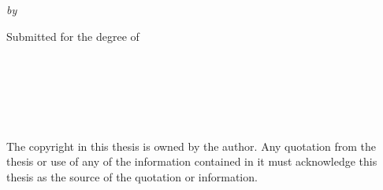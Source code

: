 \begin{center}
\vspace*{15pt}\par

\begin{spacing}{1.8}
{\Large\bfseries\MakeLowercase{\capitalisewords{\thesisTitle}}}
\end{spacing}


\vspace{50pt}\par

{\itshape\fontsize{15.5pt}{19pt}\selectfont by}\vspace{15pt}

{
\Large \authorName
}

\vspace{50pt}\par

{
\fontsize{15pt}{18pt}\selectfont Submitted for the degree of \\ \vspace{8pt} \fontsize{16pt}{19pt}\selectfont\degree
}

\vspace{140pt}\par


{\scshape\large{} \institution\\ \school\\ \university\\
}

\vspace{80pt}\par


{\Large \monthDate\ \yearDate}

\vfill

\begin{flushleft}
\doublespacing
The copyright in this thesis is owned by the author. Any quotation from the thesis or use of any of the information contained in it must acknowledge this thesis as the source of the quotation or information.
\end{flushleft}
\end{center}
